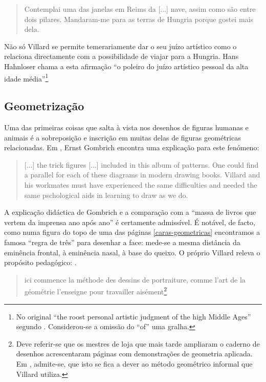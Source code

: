 \documentclass{article}
\begin{document}
\begin{quote}
Contemplai uma das janelas em Reims da [...] nave, assim como são
entre dois pilares. Mandaram-me para as terras de Hungria porque
gostei mais dela. \cite[p. 20]{villard}
\end{quote}

Não só Villard se permite temerariamente dar o seu juízo artístico
como o relaciona directamente com a possibilidade de viajar para a
Hungria. Hans Hahnloser \cite[p. 57]{hahnloser} chama a esta afirmação
``o poleiro do juízo artístico pessoal da alta idade
média''\footnote{No original ``the roost personal artistic judgment of
  the high Middle Ages'' segundo \cite{teresa}. Considerou-se a
  omissão do ``of'' uma gralha.}

\subsection{Geometrização}

Uma das primeiras coisas que salta à vista nos desenhos de figuras
humanas e animais é a sobreposição e inscrição em muitas delas de
figuras geométricas relacionadas. Em \cite[p. 130]{gombrich}, Ernst
Gombrich encontra uma explicação para este fenómeno:

\begin{quote}
  [...] the trick figures [...] included in this album of patterns. One
  could find a parallel for each of these diagrams in modern drawing
  books. Villard and his workmates must have experienced the same
  difficulties and needed the same pschological aids in learning to
  draw as we do.
\end{quote}

A explicação didáctica de Gombrich e a comparação com a ``massa de
livros que vertem da imprensa ano após ano'' \cite[p. 127]{gombrich} é
certamente admissível. É notável, de facto, como numa figura do topo
de uma das páginas \ref{caras-geometricas} encontramos a famosa
``regra de três'' para desenhar a face: mede-se a mesma distância da
eminência frontal, à eminência nasal, à base do queixo. O próprio
Villard releva o propósito pedagógico: \cite[p. 36]{villard}.

\begin{quote}
ici commence la méthode des dessins de portraiture, comme l'art de la
géométrie l'enseigne pour travailler aisément\footnote{Deve referir-se
  que os mestres de loja que mais tarde ampliaram o caderno de
  desenhos acrescentaram páginas com demonstrações de geometria
  aplicada. Em \cite{teresa}, admite-se, que isto se fica a dever ao
  método geométrico informal que Villard utiliza.}
\end{quote}
\end{document}
